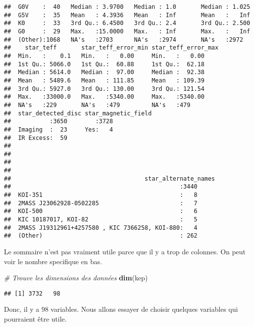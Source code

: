 \documentclass[]{article}
\newenvironment{Shaded}{\begin{snugshade}}{\end{snugshade}}
\newcommand{\KeywordTok}[1]{\textcolor[rgb]{0.13,0.29,0.53}{\textbf{{#1}}}}
\newcommand{\CommentTok}[1]{\textcolor[rgb]{0.56,0.35,0.01}{\textit{{#1}}}}
\newcommand{\NormalTok}[1]{{#1}}
\begin{document}
\begin{verbatim}
##  G0V    :  40   Median : 3.9700   Median : 1.0       Median : 1.025    
##  G5V    :  35   Mean   : 4.3936   Mean   : Inf       Mean   :   Inf    
##  K0     :  33   3rd Qu.: 6.4500   3rd Qu.: 2.4       3rd Qu.: 2.500    
##  G0     :  29   Max.   :15.0000   Max.   : Inf       Max.   :   Inf    
##  (Other):1068   NA's   :2703      NA's   :2974       NA's   :2972      
##    star_teff       star_teff_error_min star_teff_error_max
##  Min.   :    0.1   Min.   :   0.00     Min.   :   0.00    
##  1st Qu.: 5066.0   1st Qu.:  60.88     1st Qu.:  62.18    
##  Median : 5614.0   Median :  97.00     Median :  92.38    
##  Mean   : 5489.6   Mean   : 111.85     Mean   : 109.39    
##  3rd Qu.: 5927.0   3rd Qu.: 130.00     3rd Qu.: 121.54    
##  Max.   :33000.0   Max.   :5340.00     Max.   :5340.00    
##  NA's   :229       NA's   :479         NA's   :479        
##  star_detected_disc star_magnetic_field
##           :3650        :3728           
##  Imaging  :  23     Yes:   4           
##  IR Excess:  59                        
##                                        
##                                        
##                                        
##                                        
##                                      star_alternate_names
##                                                :3440     
##  KOI-351                                       :   8     
##  2MASS J23062928-0502285                       :   7     
##  KOI-500                                       :   6     
##  KIC 10187017, KOI-82                          :   5     
##  2MASS J19312961+4257580 , KIC 7366258, KOI-880:   4     
##  (Other)                                       : 262
\end{verbatim}

Le sommaire n'est pas vraiment utile parce que il y a trop de colonnes.
On peut voir le nombre specifique en bas.

\begin{Shaded}
\begin{Highlighting}[]
\CommentTok{# Trouve les dimensions des données}
\KeywordTok{dim}\NormalTok{(kep)}
\end{Highlighting}
\end{Shaded}

\begin{verbatim}
## [1] 3732   98
\end{verbatim}

Donc, il y a 98 variables. Nous allons essayer de choisir quelques
variables qui pourraient être utile.
\end{document}
